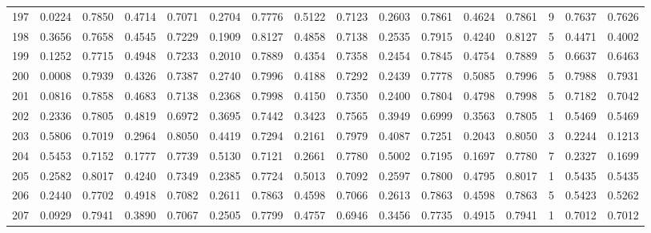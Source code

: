 \begin{tabular}{lrrrrrrrrrrrrrrr}
197 &      0.0224 &  0.7850 &  0.4714 &  0.7071 &  0.2704 &  0.7776 &  0.5122 &  0.7123 &  0.2603 &  0.7861 &   0.4624 &     0.7861 &      9 &                    0.7637 &                     0.7626 \\
198 &      0.3656 &  0.7658 &  0.4545 &  0.7229 &  0.1909 &  0.8127 &  0.4858 &  0.7138 &  0.2535 &  0.7915 &   0.4240 &     0.8127 &      5 &                    0.4471 &                     0.4002 \\
199 &      0.1252 &  0.7715 &  0.4948 &  0.7233 &  0.2010 &  0.7889 &  0.4354 &  0.7358 &  0.2454 &  0.7845 &   0.4754 &     0.7889 &      5 &                    0.6637 &                     0.6463 \\
200 &      0.0008 &  0.7939 &  0.4326 &  0.7387 &  0.2740 &  0.7996 &  0.4188 &  0.7292 &  0.2439 &  0.7778 &   0.5085 &     0.7996 &      5 &                    0.7988 &                     0.7931 \\
201 &      0.0816 &  0.7858 &  0.4683 &  0.7138 &  0.2368 &  0.7998 &  0.4150 &  0.7350 &  0.2400 &  0.7804 &   0.4798 &     0.7998 &      5 &                    0.7182 &                     0.7042 \\
202 &      0.2336 &  0.7805 &  0.4819 &  0.6972 &  0.3695 &  0.7442 &  0.3423 &  0.7565 &  0.3949 &  0.6999 &   0.3563 &     0.7805 &      1 &                    0.5469 &                     0.5469 \\
203 &      0.5806 &  0.7019 &  0.2964 &  0.8050 &  0.4419 &  0.7294 &  0.2161 &  0.7979 &  0.4087 &  0.7251 &   0.2043 &     0.8050 &      3 &                    0.2244 &                     0.1213 \\
204 &      0.5453 &  0.7152 &  0.1777 &  0.7739 &  0.5130 &  0.7121 &  0.2661 &  0.7780 &  0.5002 &  0.7195 &   0.1697 &     0.7780 &      7 &                    0.2327 &                     0.1699 \\
205 &      0.2582 &  0.8017 &  0.4240 &  0.7349 &  0.2385 &  0.7724 &  0.5013 &  0.7092 &  0.2597 &  0.7800 &   0.4795 &     0.8017 &      1 &                    0.5435 &                     0.5435 \\
206 &      0.2440 &  0.7702 &  0.4918 &  0.7082 &  0.2611 &  0.7863 &  0.4598 &  0.7066 &  0.2613 &  0.7863 &   0.4598 &     0.7863 &      5 &                    0.5423 &                     0.5262 \\
207 &      0.0929 &  0.7941 &  0.3890 &  0.7067 &  0.2505 &  0.7799 &  0.4757 &  0.6946 &  0.3456 &  0.7735 &   0.4915 &     0.7941 &      1 &                    0.7012 &                     0.7012 \\

\end{tabular}
